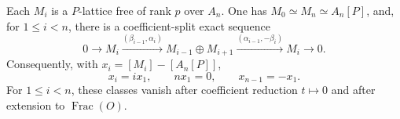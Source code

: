 \begin{lemma}\label{lem:prime-to-p-mesh}
Each \(M_i\) is a \(P\)-lattice free of rank \(p\) over \(A_n\).
One has \(M_0\simeq M_n\simeq A_n[P]\), and, for \(1\le i<n\),
there is a coefficient-split exact sequence
\begin{equation}\label{eq:prime-to-p-mesh}
 0\longrightarrow M_i
 \xrightarrow{(\beta_{i-1},\alpha_i)}
 M_{i-1}\oplus M_{i+1}
 \xrightarrow{(\alpha_{i-1},-\beta_i)}
 M_i\longrightarrow0.
\end{equation}
Consequently, with \(x_i=[M_i]-[A_n[P]]\),
\begin{equation}\label{eq:prime-to-p-mesh-order}
 x_i=i x_1,\qquad n x_1=0,\qquad x_{n-1}=-x_1.
\end{equation}
For \(1\le i<n\), these classes vanish after coefficient reduction
\(t\mapsto0\) and after extension to \(\operatorname{Frac}(O)\).
\end{lemma}

